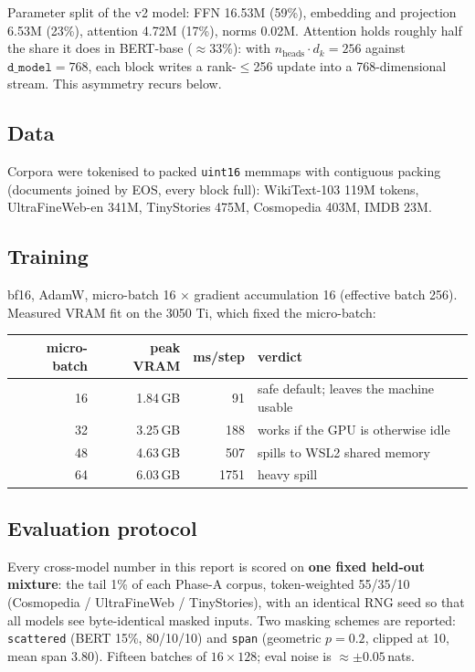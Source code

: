 \documentclass[11pt,a4paper]{article}
\newcommand{\dmodel}{\texttt{d\_model}}
\newcommand{\nats}[1]{\ensuremath{#1}\,nats}
\begin{document}
Parameter split of the v2 model: FFN 16.53M (59\%), embedding and projection 6.53M (23\%),
attention 4.72M (17\%), norms 0.02M. Attention holds roughly half the share it does in
BERT-base ($\approx$33\%): with $n_\text{heads}\cdot d_k = 256$ against $\dmodel = 768$, each
block writes a rank-$\leq$256 update into a 768-dimensional stream. This asymmetry recurs
below.

\subsection{Data}

Corpora were tokenised to packed \texttt{uint16} memmaps with contiguous packing (documents
joined by EOS, every block full): WikiText-103 119M tokens, UltraFineWeb-en 341M, TinyStories
475M, Cosmopedia 403M, IMDB 23M.

\subsection{Training}

bf16, AdamW, micro-batch 16 $\times$ gradient accumulation 16 (effective batch 256). Measured
VRAM fit on the 3050 Ti, which fixed the micro-batch:

\begin{center}\small
\begin{tabular}{rrrl}
\toprule
micro-batch & peak VRAM & ms/step & verdict \\
\midrule
16 & 1.84\,GB & 91   & safe default; leaves the machine usable \\
32 & 3.25\,GB & 188  & works if the GPU is otherwise idle \\
48 & 4.63\,GB & 507  & spills to WSL2 shared memory \\
64 & 6.03\,GB & 1751 & heavy spill \\
\bottomrule
\end{tabular}
\end{center}

\subsection{Evaluation protocol}\label{sec:protocol}

Every cross-model number in this report is scored on \textbf{one fixed held-out mixture}: the
tail 1\% of each Phase-A corpus, token-weighted 55/35/10 (Cosmopedia / UltraFineWeb /
TinyStories), with an identical RNG seed so that all models see byte-identical masked inputs.
Two masking schemes are reported: \texttt{scattered} (BERT 15\%, 80/10/10) and \texttt{span}
(geometric $p{=}0.2$, clipped at 10, mean span 3.80). Fifteen batches of $16\times128$; eval
noise is $\approx\pm$\nats{0.05}.
\end{document}
